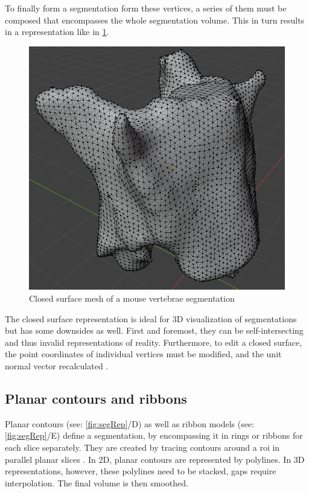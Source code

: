 \noindent
To finally form a segmentation form these vertices, a series of them must be composed that encompasses the whole segmentation volume.
This in turn results in a representation like in \cref{fig:spineMesh}.
\begin{figure}[h]
	\centerline{
		\includegraphics[scale=0.4]{images/spineMesh.png}}
	\caption{Closed surface mesh of a mouse vertebrae segmentation}\label{fig:spineMesh}
\end{figure}

\noindent
The closed surface representation is ideal for 3D visualization of segmentations but has some downsides as well.
First and foremost, they can be self-intersecting and thus invalid representations of reality.
Furthermore, to edit a closed surface, the point coordinates of individual vertices must be modified,
and the unit normal vector recalculated \cite{pinterPolymorphSegmentationRepresentation2019}.


\subsection{Planar contours and ribbons}\label{s:b-planar-contours}
Planar contours (see: \cref{fig:segRep}/D) as well as ribbon models (see: \cref{fig:segRep}/E) define a segmentation,
by encompassing it in rings or ribbons for each slice separately.
They are created by tracing contours around a \acrfull{roi} in parallel planar slices \cite{pinterPolymorphSegmentationRepresentation2019,weinsteinScanlineSurfacingBuilding2000}.
In 2D, planar contours are represented by polylines.
In 3D representations, however, these polylines need to be stacked, gaps require interpolation.
The final volume is then smoothed.

